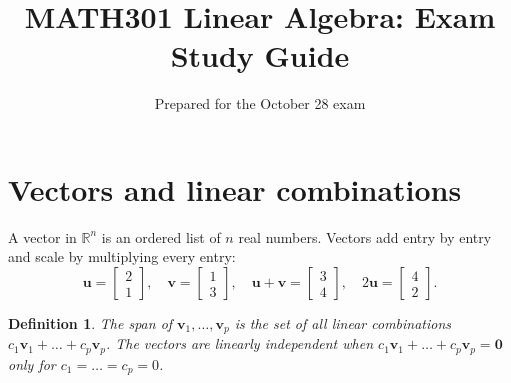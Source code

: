 \documentclass[11pt]{article}
\title{MATH301 Linear Algebra: Exam Study Guide}
\author{Prepared for the October 28 exam}
\date{}
\newtheorem*{definition}{Definition}
\begin{document}
\maketitle
\tableofcontents

\section{Vectors and linear combinations}

A vector in $\mathbb{R}^n$ is an ordered list of $n$ real numbers. Vectors add
entry by entry and scale by multiplying every entry:
\[
\mathbf{u} = \begin{bmatrix} 2 \\ 1 \end{bmatrix},\quad
\mathbf{v} = \begin{bmatrix} 1 \\ 3 \end{bmatrix},\quad
\mathbf{u} + \mathbf{v} = \begin{bmatrix} 3 \\ 4 \end{bmatrix},\quad
2\mathbf{u} = \begin{bmatrix} 4 \\ 2 \end{bmatrix}.
\]

\begin{center}
\end{center}

\begin{definition}
The \emph{span} of $\mathbf{v}_1,\dots,\mathbf{v}_p$ is the set of all linear
combinations $c_1\mathbf{v}_1 + \dots + c_p\mathbf{v}_p$. The vectors are
\emph{linearly independent} when $c_1\mathbf{v}_1 + \dots + c_p\mathbf{v}_p = \mathbf{0}$
only for $c_1 = \dots = c_p = 0$.
\end{definition}
\end{document}
